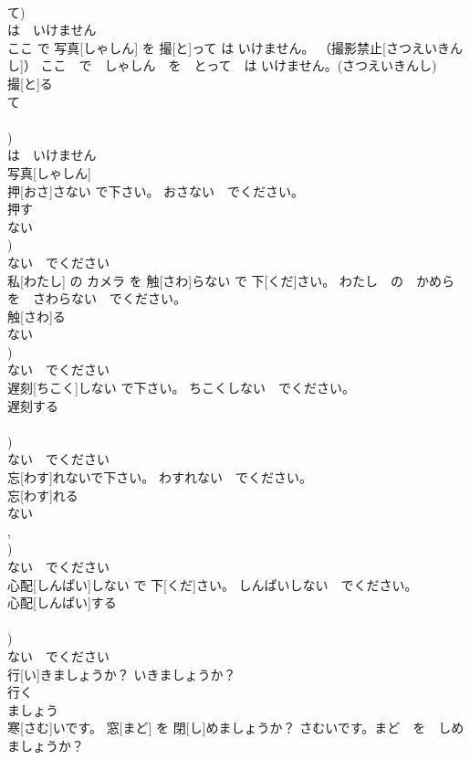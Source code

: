 \documentclass[8pt]{extreport}
\begin{document}
\begin{CJK}{UTF8}{min}
\\	て)	
\\	は　いけません 
\\	ここ で 写真[しゃしん] を 撮[と]って は いけません。 （撮影禁止[さつえいきんし]）	ここ　で　しゃしん　を　とって　は いけません。(さつえいきんし)	
\\	撮[と]る 
\\	て 
\\	[る/つ/う] 
\\	[って])	
\\	は　いけません 
\\	写真[しゃしん] 
\\	押[おさ]さない で下さい。	おさない　でください。	
\\	押す 
\\	ない 
\\	[ない])	
\\	ない　でください 
\\	私[わたし] の カメラ を 触[さわ]らない で 下[くだ]さい。	わたし　の　かめら　を　さわらない　でください。	
\\	触[さわ]る 
\\	ない 
\\	[ない])	
\\	ない　でください 
\\	遅刻[ちこく]しない で下さい。	ちこくしない　でください。	
\\	遅刻する 
\\	[する] 
\\	[しない])	
\\	ない　でください 
\\	忘[わす]れないで下さい。	わすれない　でください。	
\\	忘[わす]れる 
\\	ない 
\\	[る], 
\\	[ない])	
\\	ない　でください 
\\	心配[しんぱい]しない で 下[くだ]さい。	しんぱいしない　でください。	
\\	心配[しんぱい]する 
\\	[する] 
\\	[しない])	
\\	ない　でください 
\\	行[い]きましょうか？	いきましょうか？	
\\	行く 
\\	ましょう 
\\	寒[さむ]いです。 窓[まど] を 閉[し]めましょうか？	さむいです。まど　を　しめましょうか？	

\end{CJK}
\end{document}
